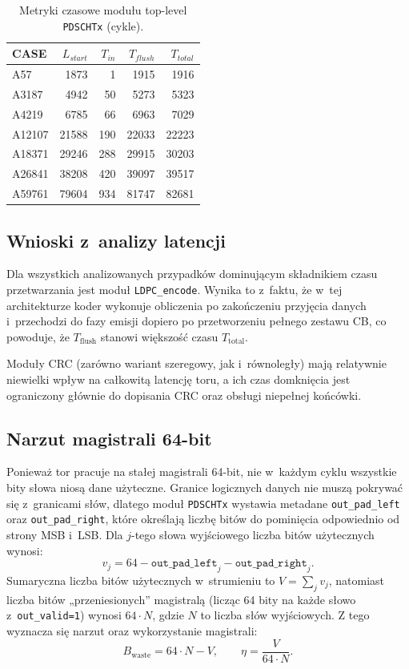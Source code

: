 \begin{table}[!ht]
\centering
\caption{Metryki czasowe modułu top-level \texttt{PDSCHTx} (cykle).}
\label{tab:lat_pdschtx}
\begin{tabular}{lrrrr}
\hline
CASE & $L_{start}$ & $T_{in}$ & $T_{flush}$ & $T_{total}$ \\
\hline
A57     & 1873  & 1   & 1915  & 1916 \\
A3187   & 4942  & 50  & 5273  & 5323 \\
A4219   & 6785  & 66  & 6963  & 7029 \\
A12107  & 21588 & 190 & 22033 & 22223 \\
A18371  & 29246 & 288 & 29915 & 30203 \\
A26841  & 38208 & 420 & 39097 & 39517 \\
A59761  & 79604 & 934 & 81747 & 82681 \\
\hline
\end{tabular}
\end{table}

\subsection{Wnioski z~analizy latencji}
\label{subsec:latency_conclusions}

Dla wszystkich analizowanych przypadków dominującym składnikiem czasu przetwarzania jest moduł \texttt{LDPC\_encode}.
Wynika to z~faktu, że w~tej architekturze koder wykonuje obliczenia po zakończeniu przyjęcia danych i~przechodzi do fazy emisji
dopiero po przetworzeniu pełnego zestawu CB, co powoduje, że $T_{\mathrm{flush}}$ stanowi większość czasu $T_{\mathrm{total}}$.

Moduły CRC (zarówno wariant szeregowy, jak i~równoległy) mają relatywnie niewielki wpływ na całkowitą latencję toru,
a ich czas domknięcia jest ograniczony głównie do dopisania CRC oraz obsługi niepełnej końcówki.

\subsection{Narzut magistrali 64-bit}
\label{subsec:pdsch_padding_overhead}

Ponieważ tor pracuje na stałej magistrali 64-bit, nie w~każdym cyklu wszystkie bity słowa niosą dane użyteczne.
Granice logicznych danych nie muszą pokrywać się z~granicami słów, dlatego moduł \texttt{PDSCHTx} wystawia metadane
\texttt{out\_pad\_left} oraz \texttt{out\_pad\_right}, które określają liczbę bitów do pominięcia odpowiednio od strony MSB i~LSB.
Dla $j$-tego słowa wyjściowego liczba bitów użytecznych wynosi:
\[
v_j = 64 - \texttt{out\_pad\_left}_j - \texttt{out\_pad\_right}_j.
\]
Sumaryczna liczba bitów użytecznych w~strumieniu to $V=\sum_j v_j$, natomiast liczba bitów „przeniesionych” magistralą
(licząc 64 bity na każde słowo z~\texttt{out\_valid=1}) wynosi $64\cdot N$, gdzie $N$ to liczba słów wyjściowych.
Z tego wyznacza się narzut oraz wykorzystanie magistrali:
\[
B_{\mathrm{waste}} = 64\cdot N - V,
\qquad
\eta = \frac{V}{64\cdot N}.
\]

